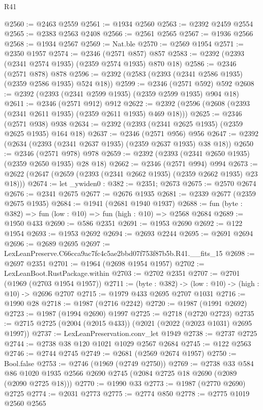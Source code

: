 \begin{lexlean}{R41}
\begin{coremodule}
@2560 := @2463 @2559
@2561 := @1934 @2560
@2563 := @2392 @2459 @2554
@2565 := @2383 @2563 @2408
@2566 := @2561 @2565
@2567 := @1936 @2566
@2568 := @1934 @2567
@2569 := Nat.ble
@2570 := @2569 @1954
@2571 := @2350 @1957
@2574 := @2346 (@2571 @857) @857
@2583 := @2392 (@2393 (@2341 @2574 @1935) (@2359 @2574 @1935) @870 @18)
@2586 := @2346 (@2571 @878) @878
@2596 := @2392 (@2583 (@2393 (@2341 @2586 @1935) (@2359 @2586 @1935) @524 @18))
@2599 := @2346 (@2571 @592) @592
@2608 := @2392 (@2393 (@2341 @2599 @1935) (@2359 @2599 @1935) @904 @18)
@2611 := @2346 (@2571 @912) @912
@2622 := @2392 (@2596 (@2608 (@2393 (@2341 @2611 @1935) (@2359 @2611 @1935) @469 @18)))
@2625 := @2346 (@2571 @938) @938
@2634 := @2392 (@2393 (@2341 @2625 @1935) (@2359 @2625 @1935) @164 @18)
@2637 := @2346 (@2571 @956) @956
@2647 := @2392 (@2634 (@2393 (@2341 @2637 @1935) (@2359 @2637 @1935) @38 @18))
@2650 := @2346 (@2571 @978) @978
@2659 := @2392 (@2393 (@2341 @2650 @1935) (@2359 @2650 @1935) @28 @18)
@2662 := @2346 (@2571 @994) @994
@2673 := @2622 (@2647 (@2659 (@2393 (@2341 @2662 @1935) (@2359 @2662 @1935) @23 @18)))
@2674 := let _ywiden0 : @382 := @2351; @2673
@2675 := @2570 @2674
@2676 := @2341 @2675
@2677 := @2676 @1935
@2681 := @2339 @2677 (@2359 @2675 @1935)
@2684 := @1941 (@2681 @1940 @1937)
@2688 := fun (byte : @382) => fun (low : @10) => fun (high : @10) => @2568 @2684
@2689 := @1950 @433
@2690 := @586 @2351
@2691 := @1953 @2690
@2692 := @122 @1954
@2693 := @1953 @2692
@2694 := @2693 @2244
@2695 := @2691 @2694
@2696 := @2689 @2695
@2697 := LexLeanPreserve.C66cca9ac7fc4c5ae2bbd07f753f87b5b.R41.__fits_15
@2698 := @2697 @2351
@2701 := @1964 (@2698 @1954 @1957)
@2702 := LexLeanBoot.RustPackage.within
@2703 := @2702 @2351
@2707 := @2701 (@1969 (@2703 @1954 @1957))
@2711 := (byte : @382) -> (low : @10) -> (high : @10) -> @2696 @2707
@2715 := @1979 @433 @2695 @2707 @1031
@2716 := @1990 @28
@2718 := @1987 (@2716 @2242)
@2720 := @1987 (@1991 @2692)
@2723 := @1987 (@1994 @2690) @1997
@2725 := @2718 (@2720 @2723)
@2735 := @2715 @2725 (@2004 (@2015 @433)) (@2021 (@2022 (@2023 @1031) @2695 @1997))
@2737 := LexLeanPreservation.conv_let @1949
@2738 := @2737 @2725
@2744 := @2738 @38 @120 @1021 @1029 @2567 @2684
@2745 := @122 @2563
@2746 := @2744 @2745
@2749 := @2681 (@2569 @2674 @1957)
@2750 := Bool.false
@2753 := @2746 (@1969 (@2749 @2750))
@2769 := @2738
    @33
    @584
    @86
    @1020
    @1935
    @2566
    @2690
    @2745
    (@2084 @2725 @18 @2690 (@2089 (@2090 @2725 @18)))
@2770 := @1990 @33
@2773 := @1987 (@2770 @2690) @2725
@2774 := @2031 @2773
@2775 := @2774 @850
@2778 := @2775 @1019 @2560 @2565

\end{coremodule}
\end{lexlean}
